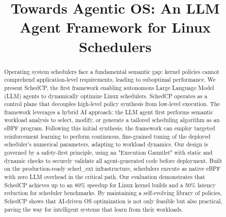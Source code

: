\documentclass[sigplan,anonymous,10pt]{acmart}
\begin{document}
\title{Towards Agentic OS: An LLM Agent Framework for Linux Schedulers}



\begin{abstract}
  Operating system schedulers face a fundamental semantic gap: kernel policies cannot comprehend application-level requirements, leading to suboptimal performance. We present SchedCP, the first framework enabling autonomous Large Language Model (LLM) agents to dynamically optimize Linux schedulers. SchedCP operates as a control plane that decouples high-level policy synthesis from low-level execution. The framework leverages a hybrid AI approach: the LLM agent first performs semantic workload analysis to select, modify, or generate a tailored scheduling algorithm as an eBPF program. Following this initial synthesis, the framework can employ targeted reinforcement learning to perform continuous, fine-grained tuning of the deployed scheduler's numerical parameters, adapting to workload dynamics. Our design is governed by a safety-first principle, using an "Execution Gauntlet" with static and dynamic checks to securely validate all agent-generated code before deployment. Built on the production-ready sched\_ext infrastructure, schedulers execute as native eBPF with zero LLM overhead in the critical path. Our evaluation demonstrates that SchedCP achieves up to an 80\% speedup for Linux kernel builds and a 50\% latency reduction for scheduler benchmarks. By maintaining a self-evolving library of policies, SchedCP shows that AI-driven OS optimization is not only feasible but also practical, paving the way for intelligent systems that learn from their workloads.
\end{abstract}
\end{document}
